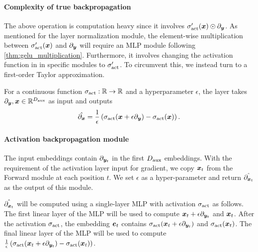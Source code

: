\paragraph{Complexity of true backpropagation} The above operation is computation heavy since 
 it involves $\sigma_{\textrm{act}}'({\bm{x}}) \odot \partial_{{\bm{y}}}$. As mentioned for the layer normalization module, the element-wise multiplication between $\sigma_{\textrm{act}}'({\bm{x}})$ and $\partial_{{\bm{y}}}$ will require an MLP module following \cref{thm:gelu_multiplication}. Furthermore, it involves changing the activation function in \simulator{} in specific modules to $\sigma_{\textrm{act}}'$. To circumvent this, we instead turn to a first-order Taylor approximation.


\begin{definition}\label{def:approx_act_backprop}
   For a continuous function $\sigma_{\textrm{act}}: \mathbb{R} \to \mathbb{R}$ and a hyperparameter $\epsilon$, the layer takes $\partial_{ {\bm{y}} }, {\bm{x}} \in\mathbb{R}^{D_{\text{aux}}}$ as input and outputs
    \begin{align*}
        \Hat{ \partial_{ {\bm{x}} } } = \frac{1}{\epsilon} \left( \sigma_{\textrm{act}}({\bm{x}} + \epsilon \partial_{{\bm{y}}}) - \sigma_{\textrm{act}}({\bm{x}}) \right).
    \end{align*}
\end{definition}





\paragraph{\simulator{} Activation backpropagation module}
The input embeddings contain $\partial_{{\bm{y}}_t}$ in the first $D_{\text{aux}}$ embeddings. 
With the requirement of the activation layer input for gradient, we copy ${\bm{x}}_t$ from the Forward module at each position $t$. We set $\epsilon$ as a hyper-parameter and return $\Hat{ \partial_{ {\bm{x}}_t } }$ as the output of this module.


$\Hat{ \partial_{ {\bm{x}}_t } }$ will be computed using a single-layer MLP with activation $\sigma_{\textrm{act}}$ as follows. The first linear layer of the MLP will be used to compute ${\bm{x}}_t + \epsilon \partial_{{\bm{y}}_t}$ and ${\bm{x}}_t$. After the activation $\sigma_{\textrm{act}}$, the embedding $\ve_t$ contains $\sigma_{\textrm{act}}({\bm{x}}_t + \epsilon \partial_{{\bm{y}}_t})$ and $\sigma_{\textrm{act}}({\bm{x}}_t)$. The final linear layer of the MLP will be used to compute $\frac{1}{\epsilon} \left( \sigma_{\textrm{act}}({\bm{x}}_t + \epsilon \partial_{{\bm{y}}_t}) - \sigma_{\textrm{act}}({\bm{x}}_t) \right)$.



